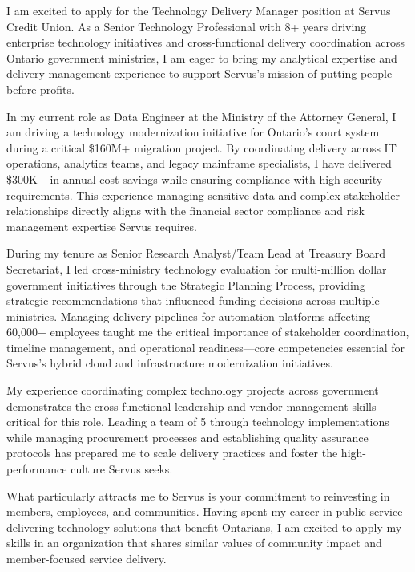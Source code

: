 \storeletterdate{\today}

\begin{storedcvletter}{
I am excited to apply for the Technology Delivery Manager position at Servus Credit Union. As a Senior Technology Professional with 8+ years driving enterprise technology initiatives and cross-functional delivery coordination across Ontario government ministries, I am eager to bring my analytical expertise and delivery management experience to support Servus's mission of putting people before profits.

In my current role as Data Engineer at the Ministry of the Attorney General, I am driving a technology modernization initiative for Ontario's court system during a critical \$160M+ migration project. By coordinating delivery across IT operations, analytics teams, and legacy mainframe specialists, I have delivered \$300K+ in annual cost savings while ensuring compliance with high security requirements. This experience managing sensitive data and complex stakeholder relationships directly aligns with the financial sector compliance and risk management expertise Servus requires.

During my tenure as Senior Research Analyst/Team Lead at Treasury Board Secretariat, I led cross-ministry technology evaluation for multi-million dollar government initiatives through the Strategic Planning Process, providing strategic recommendations that influenced funding decisions across multiple ministries. Managing delivery pipelines for automation platforms affecting 60,000+ employees taught me the critical importance of stakeholder coordination, timeline management, and operational readiness—core competencies essential for Servus's hybrid cloud and infrastructure modernization initiatives.

My experience coordinating complex technology projects across government demonstrates the cross-functional leadership and vendor management skills critical for this role. Leading a team of 5 through technology implementations while managing procurement processes and establishing quality assurance protocols has prepared me to scale delivery practices and foster the high-performance culture Servus seeks.

What particularly attracts me to Servus is your commitment to reinvesting in members, employees, and communities. Having spent my career in public service delivering technology solutions that benefit Ontarians, I am excited to apply my skills in an organization that shares similar values of community impact and member-focused service delivery.

}
\end{storedcvletter}
